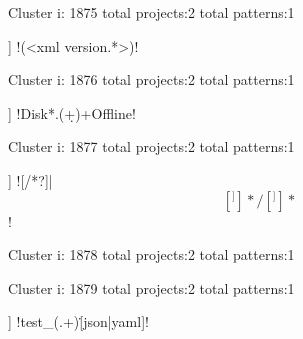 Cluster i: 1875
total projects:2
total patterns:1
\begin{multicols}{1}
\begin{description}[noitemsep,topsep=0pt]
\item [[2] ] \cverb!(<\?xml version.*\?>)!
\end{description}
\end{multicols}







Cluster i: 1876
total projects:2
total patterns:1
\begin{multicols}{1}
\begin{description}[noitemsep,topsep=0pt]
\item [[2] ] \cverb!Disk*.(\d+)\s+Offline!
\end{description}
\end{multicols}







Cluster i: 1877
total projects:2
total patterns:1
\begin{multicols}{1}
\begin{description}[noitemsep,topsep=0pt]
\item [[2] ] \cverb![/*?]|\[[^]]*/[^]]*\]!
\end{description}
\end{multicols}







Cluster i: 1878
total projects:2
total patterns:1
\begin{multicols}{1}
\end{multicols}







Cluster i: 1879
total projects:2
total patterns:1
\begin{multicols}{1}
\begin{description}[noitemsep,topsep=0pt]
\item [[2] ] \cverb!test_(.+)\.[json|yaml]!
\end{description}
\end{multicols}







